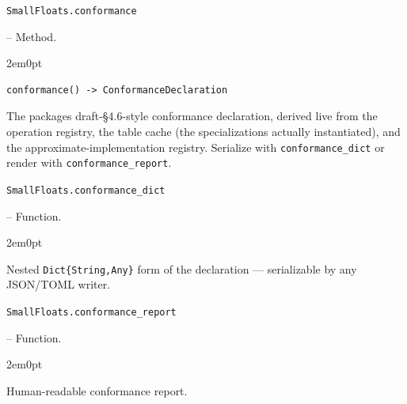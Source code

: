\par\medskip\noindent\begin{minipage}{\linewidth}
\hypertarget{16371925287560310251}{\texttt{SmallFloats.conformance}}  -- {Method.}
\nopagebreak
\begin{adjustwidth}{2em}{0pt}


\begin{verbatim}
conformance() -> ConformanceDeclaration
\end{verbatim}

The package{\textquotesingle}s draft-§4.6-style conformance declaration, derived live from the operation registry, the table cache (the specializations actually instantiated), and the approximate-implementation registry. Serialize with \texttt{conformance\_\allowbreak{}dict} or render with \texttt{conformance\_\allowbreak{}report}.



\end{adjustwidth}
\end{minipage}
\par\medskip

\par\medskip\noindent\begin{minipage}{\linewidth}
\hypertarget{132348358124900907}{\texttt{SmallFloats.conformance\_\allowbreak{}dict}}  -- {Function.}
\nopagebreak
\begin{adjustwidth}{2em}{0pt}

Nested \texttt{Dict\{String,Any\}} form of the declaration — serializable by any JSON/TOML writer.



\end{adjustwidth}
\end{minipage}
\par\medskip

\par\medskip\noindent\begin{minipage}{\linewidth}
\hypertarget{7789835443308218455}{\texttt{SmallFloats.conformance\_\allowbreak{}report}}  -- {Function.}
\nopagebreak
\begin{adjustwidth}{2em}{0pt}

Human-readable conformance report.



\end{adjustwidth}
\end{minipage}
\par\medskip

